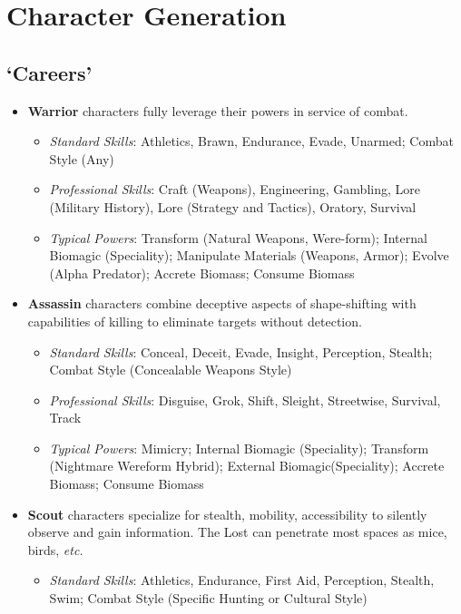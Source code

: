 \documentclass[letterpaper,serif]{rpg-module}
\begin{document}
\section{Character Generation}

\subsection{`Careers'}

\begin{itemize}
    \item \textbf{Warrior} characters fully leverage their powers in service of combat.
    \begin{itemize}
        \item \emph{Standard Skills}: Athletics, Brawn, Endurance, Evade, Unarmed; Combat Style (Any)
        \item \emph{Professional Skills}: Craft (Weapons), Engineering, Gambling, Lore (Military History), Lore (Strategy and Tactics), Oratory, Survival
        \item \emph{Typical Powers}: Transform (Natural Weapons, Were-form); Internal Biomagic (Speciality); Manipulate Materials (Weapons, Armor); Evolve (Alpha Predator); Accrete Biomass; Consume Biomass
    \end{itemize}
    \item \textbf{Assassin} characters combine deceptive aspects of shape-shifting with capabilities of killing to eliminate targets without detection. 
    \begin{itemize}
        \item \emph{Standard Skills}: Conceal, Deceit, Evade, Insight, Perception, Stealth; Combat Style (Concealable Weapons Style)
        \item \emph{Professional Skills}: Disguise, Grok, Shift, Sleight, Streetwise, Survival, Track
        \item \emph{Typical Powers}: Mimicry; Internal Biomagic (Speciality); Transform (Nightmare Wereform Hybrid); External Biomagic(Speciality); Accrete Biomass; Consume Biomass
    \end{itemize}
    \item \textbf{Scout} characters specialize for stealth, mobility, accessibility to silently observe and gain information. The Lost can penetrate most spaces as mice, birds, \emph{etc.}
    \begin{itemize}
        \item \emph{Standard Skills}: Athletics, Endurance, First Aid, Perception, Stealth, Swim; Combat Style (Specific Hunting or Cultural Style)

\end{itemize}
\end{itemize}
\end{document}
